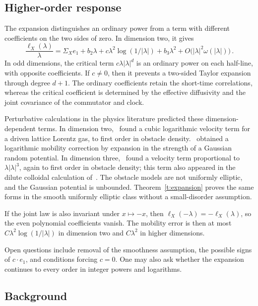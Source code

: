 \documentclass[11pt]{amsart}
\theoremstyle{definition}
\theoremstyle{remark}
\numberwithin{equation}{section}
\begin{document}
\subsection{Higher-order response}\label{ss.intro-sharpness}

The expansion distinguishes an ordinary power from a term with different coefficients on the two sides of zero. In dimension two, it gives
\begin{equation*}
 \frac{\ell_X(\lambda)}\lambda
 =\Sigma_Xe_1+b_2\lambda+c\lambda^2\log(1/|\lambda|)
 +b_3\lambda^2+O\bigl(|\lambda|^2\omega(|\lambda|)\bigr)\, .
\end{equation*}
In odd dimensions, the critical term $c\lambda|\lambda|^d$ is an ordinary power on each half-line, with opposite coefficients. If $c\neq0$, then it prevents a two-sided Taylor expansion through degree $d+1$. The ordinary coefficients retain the short-time correlations, whereas the critical coefficient is determined by the effective diffusivity and the joint covariance of the commutator and clock.

Perturbative calculations in the physics literature predicted these dimension-dependent terms. In dimension two,~\citet*{LeitmannFranosch2013} found a cubic logarithmic velocity term for a driven lattice Lorentz gas, to first order in obstacle density.~\citet{Novikov2018} obtained a logarithmic mobility correction by expansion in the strength of a Gaussian random potential. In dimension three,~\citet*{LeitmannBenichouFranosch2018} found a velocity term proportional to $\lambda|\lambda|^3$, again to first order in obstacle density; this term also appeared in the dilute colloidal calculation of~\citet*{SquiresBrady2005}. The obstacle models are not uniformly elliptic, and the Gaussian potential is unbounded. Theorem~\ref{t:expansion} proves the same forms in the smooth uniformly elliptic class without a small-disorder assumption.

If the joint law is also invariant under $x\mapsto-x$, then $\ell_X(-\lambda)=-\ell_X(\lambda)$, so the even polynomial coefficients vanish. The mobility error is then at most $C\lambda^2\log(1/|\lambda|)$ in dimension two and $C\lambda^2$ in higher dimensions.

Open questions include removal of the smoothness assumption, the possible signs of $c\cdot e_1$, and conditions forcing $c=0$. One may also ask whether the expansion continues to every order in integer powers and logarithms.

\subsection{Background}\label{ss.background}
\end{document}
